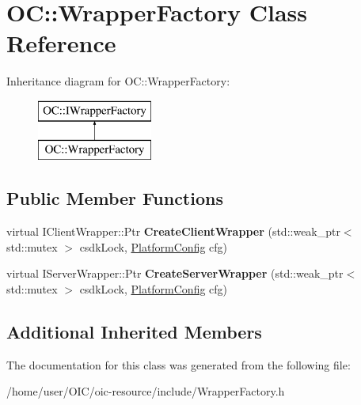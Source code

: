 \hypertarget{classOC_1_1WrapperFactory}{}\section{O\+C\+:\+:Wrapper\+Factory Class Reference}
\label{classOC_1_1WrapperFactory}
Inheritance diagram for O\+C\+:\+:Wrapper\+Factory\+:\begin{figure}[H]
\begin{center}
\leavevmode
\includegraphics[height=2.000000cm]{classOC_1_1WrapperFactory}
\end{center}
\end{figure}
\subsection*{Public Member Functions}
\begin{DoxyCompactItemize}
\item 
\hypertarget{classOC_1_1WrapperFactory_a6ded2fe20b7eac4adb686ad4abb02508}{}virtual I\+Client\+Wrapper\+::\+Ptr {\bfseries Create\+Client\+Wrapper} (std\+::weak\+\_\+ptr$<$ std\+::mutex $>$ csdk\+Lock, \hyperlink{structOC_1_1PlatformConfig}{Platform\+Config} cfg)\label{classOC_1_1WrapperFactory_a6ded2fe20b7eac4adb686ad4abb02508}

\item 
\hypertarget{classOC_1_1WrapperFactory_a82b951f3b46b68fc2726f41a248c9c32}{}virtual I\+Server\+Wrapper\+::\+Ptr {\bfseries Create\+Server\+Wrapper} (std\+::weak\+\_\+ptr$<$ std\+::mutex $>$ csdk\+Lock, \hyperlink{structOC_1_1PlatformConfig}{Platform\+Config} cfg)\label{classOC_1_1WrapperFactory_a82b951f3b46b68fc2726f41a248c9c32}

\end{DoxyCompactItemize}
\subsection*{Additional Inherited Members}


The documentation for this class was generated from the following file\+:\begin{DoxyCompactItemize}
\item 
/home/user/\+O\+I\+C/oic-\/resource/include/Wrapper\+Factory.\+h\end{DoxyCompactItemize}
